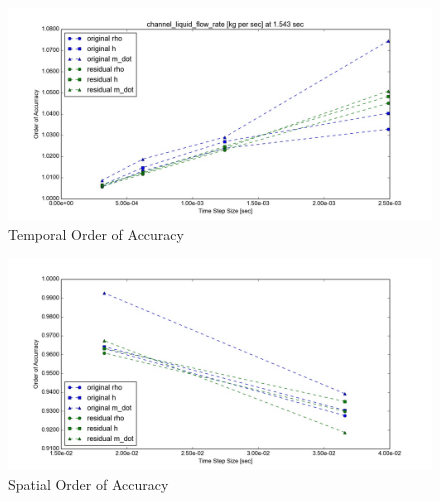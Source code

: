 \documentclass{mc2015}
\begin{document}
\begin{figure}[!h]
	\centering
	\includegraphics[width=1.00\textwidth]{images/Temporal_Study/Order_Of_Accuracy_Summary}
	\caption{Temporal Order of Accuracy}
	\label{fig:Temporal:OOA}
\end{figure}

\begin{figure}[!h]
	\centering
	\includegraphics[width=1.00\textwidth]{images/Spatial_Study/Order_Of_Accuracy_Summary}
	\caption{Spatial Order of Accuracy}
	\label{fig:Spatial:OOA}
\end{figure}

%
%
%
%
%
%
%
%
\end{document}
